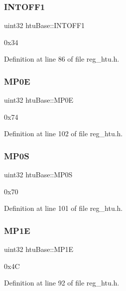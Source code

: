 \subsubsection{\texorpdfstring{I\+N\+T\+O\+F\+F1}{INTOFF1}}
{\footnotesize\ttfamily uint32 htu\+Base\+::\+I\+N\+T\+O\+F\+F1}

0x34 

Definition at line 86 of file reg\+\_\+htu.\+h.

\mbox{\label{structhtuBase_a8934713e651d31f74455913f5f5e37e0}} 
\subsubsection{\texorpdfstring{M\+P0E}{MP0E}}
{\footnotesize\ttfamily uint32 htu\+Base\+::\+M\+P0E}

0x74 

Definition at line 102 of file reg\+\_\+htu.\+h.

\mbox{\label{structhtuBase_a83a265b0353852ce71bfcf4af623f574}} 
\subsubsection{\texorpdfstring{M\+P0S}{MP0S}}
{\footnotesize\ttfamily uint32 htu\+Base\+::\+M\+P0S}

0x70 

Definition at line 101 of file reg\+\_\+htu.\+h.

\mbox{\label{structhtuBase_aa68999b1ea64c9411bae74c20092e59f}} 
\subsubsection{\texorpdfstring{M\+P1E}{MP1E}}
{\footnotesize\ttfamily uint32 htu\+Base\+::\+M\+P1E}

0x4C 

Definition at line 92 of file reg\+\_\+htu.\+h.

\mbox{\label{structhtuBase_a31f4daa36a95a7b217f749d61f80fee0}} 
